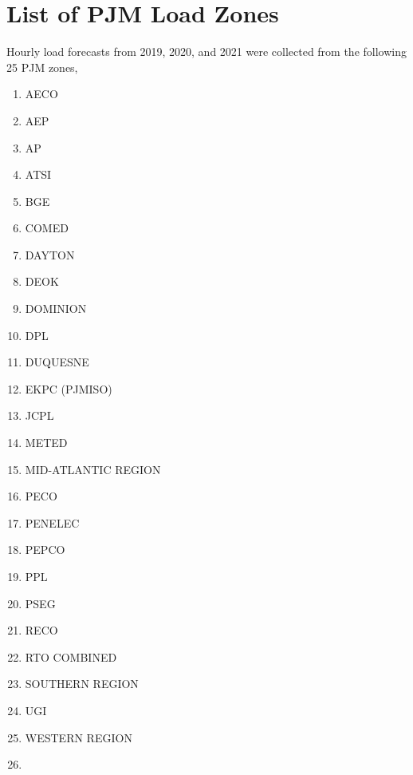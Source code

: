 \chapter{List of PJM Load Zones}\label{ch:list-of-pjm-load-zones}

 Hourly load forecasts from 2019, 2020, and 2021 were collected from the following 25 PJM zones,

\begin{multicols}{2}
{\footnotesize
\begin{enumerate}
    \item AECO
    \item AEP
    \item AP
    \item ATSI
    \item BGE
    \item COMED
    \item DAYTON
    \item DEOK
    \item DOMINION
    \item DPL
    \item DUQUESNE
    \item EKPC (PJMISO)
    \item JCPL
    \item METED
    \item MID-ATLANTIC REGION
    \item PECO
    \item PENELEC
    \item PEPCO
    \item PPL
    \item PSEG
    \item RECO
    \item RTO COMBINED
    \item SOUTHERN REGION
    \item UGI
    \item WESTERN REGION
    \item []
\end{enumerate}}
\end{multicols}
